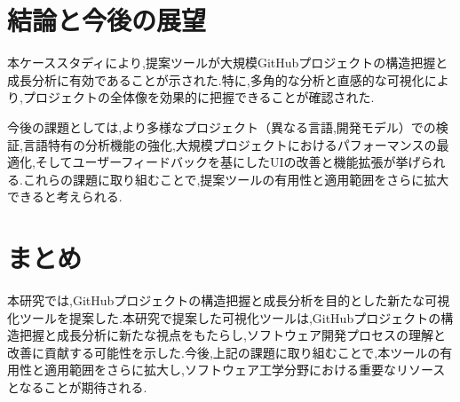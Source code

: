 \documentclass[12pt,twoside]{jbook}
\begin{document}
\chapter{結論と今後の展望}
本ケーススタディにより,提案ツールが大規模GitHubプロジェクトの構造把握と成長分析に有効であることが示された.特に,多角的な分析と直感的な可視化により,プロジェクトの全体像を効果的に把握できることが確認された.

今後の課題としては,より多様なプロジェクト（異なる言語,開発モデル）での検証,言語特有の分析機能の強化,大規模プロジェクトにおけるパフォーマンスの最適化,そしてユーザーフィードバックを基にしたUIの改善と機能拡張が挙げられる.これらの課題に取り組むことで,提案ツールの有用性と適用範囲をさらに拡大できると考えられる.
\chapter{まとめ}
本研究では,GitHubプロジェクトの構造把握と成長分析を目的とした新たな可視化ツールを提案した.本研究で提案した可視化ツールは,GitHubプロジェクトの構造把握と成長分析に新たな視点をもたらし,ソフトウェア開発プロセスの理解と改善に貢献する可能性を示した.今後,上記の課題に取り組むことで,本ツールの有用性と適用範囲をさらに拡大し,ソフトウェア工学分野における重要なリソースとなることが期待される.



%
%




\appendix
\end{document}
